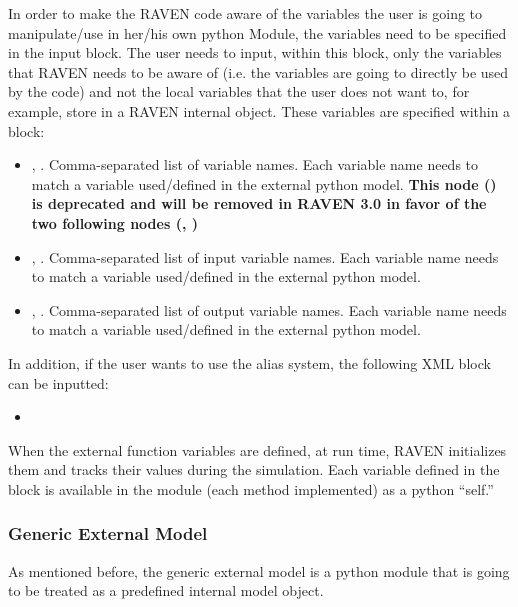 In order to make the RAVEN code aware of the variables the user is going to
manipulate/use in her/his own python Module, the variables need to be specified
in the  input block.
%
The user needs to input, within this block, only the variables that RAVEN needs
to be aware of (i.e. the variables are going to directly be used by the code)
and not the local variables that the user does not want to, for example, store
in a RAVEN internal object.
%
These variables are specified within a  block:
\begin{itemize}
  \item {}, .
  Comma-separated list of variable names.
  Each variable name needs to match a variable used/defined in the external python
  model.
  \nb \textbf{This node () is deprecated and will be removed in RAVEN 3.0 in favor of the two following nodes (, ) }
   \item {}, .
  Comma-separated list of input variable names.
  Each variable name needs to match a variable used/defined in the external python
  model.
   \item {}, .
  Comma-separated list of output variable names.
  Each variable name needs to match a variable used/defined in the external python
  model.
\end{itemize}

In addition, if the user wants to use the alias system, the following XML block can be inputted:
\begin{itemize}
  \item {}
\end{itemize}


When the external function variables are defined, at run time, RAVEN initializes
them and tracks their values during the simulation.
%
Each variable defined in the  block is available in the
module (each method implemented) as a python ``self.''
%


\subsubsection{Generic External Model}
\label{subsubsec:generic_external_model}
As mentioned before, the generic external model is a python module that is going to be
treated as a predefined internal model object.

